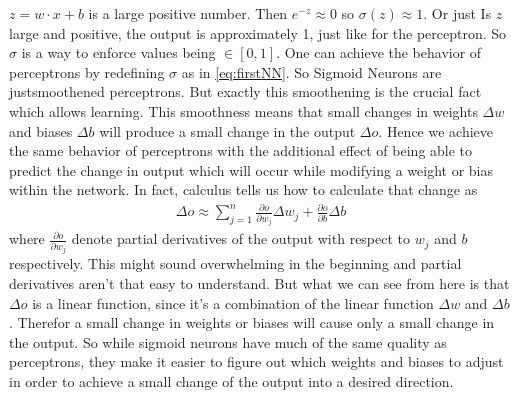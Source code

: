 \documentclass[10pt]{book}
\begin{document}
    \(z = w \cdot x + b\) is a large positive number. Then \(e^{-z} \approx 0\) so \(\sigma(z) \approx 1\). Or just
    \dq Is \(z\) large and positive, the output is approximately 1\dq, just like for the perceptron. So \(\sigma\) is a way
    to enforce values being \(\in [0, 1]\). One can achieve the behavior of perceptrons by redefining \(\sigma\) as in \eqref{eq:firstNN}.
    So Sigmoid Neurons are \dq just\dq smoothened perceptrons. But exactly this smoothening is the crucial fact which allows learning.
    This smoothness means that small changes in weights \(\Delta w\) and biases \(\Delta b\) will produce a small change in the output \(\Delta o\).
    Hence we achieve the same behavior of perceptrons with the additional effect of being able to predict the change in output which will occur while
    modifying a weight or bias within the network.
    In fact, calculus tells us how to calculate that change as
    \begin{align}
        \Delta o \approx \sum \limits_{j=1}^n \frac{\partial o}{\partial w_j} \Delta w_j + \frac{\partial o}{\partial b} \Delta b
    \end{align}
    where \(\frac{\partial o}{\partial w_j}\) denote partial derivatives of the output with respect to \(w_j\) and \(b\) respectively.
    This might sound overwhelming in the beginning and partial derivatives aren't that easy to understand. But what we can see from here
    is that \(\Delta o\) is a linear function, since it's a combination of the linear function \(\Delta w\) and \(\Delta b\). Therefor
    a small change in weights or biases will cause only a small change in the output. So while sigmoid neurons have much of the same quality
    as perceptrons, they make it easier to figure out which weights and biases to adjust in order to achieve a small change of the output
    into a desired direction.\newline
    
\end{document}
